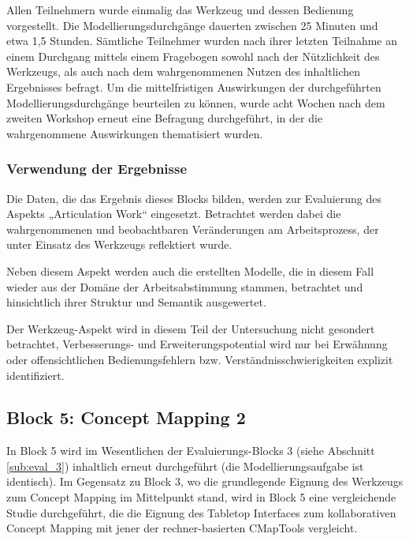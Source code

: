 Allen Teilnehmern wurde einmalig das Werkzeug und dessen Bedienung vorgestellt. Die Modellierungsdurchgänge dauerten zwischen 25 Minuten und etwa 1,5 Stunden. Sämtliche Teilnehmer wurden nach ihrer letzten Teilnahme an einem Durchgang mittels einem Fragebogen sowohl nach der Nützlichkeit des Werkzeugs, als auch nach dem wahrgenommenen Nutzen des inhaltlichen Ergebnisses befragt. Um die mittelfristigen Auswirkungen der durchgeführten Modellierungsdurchgänge beurteilen zu können, wurde acht Wochen nach dem zweiten Workshop erneut eine Befragung durchgeführt, in der die wahrgenommene Auswirkungen thematisiert wurden. 


\subsubsection{Verwendung der Ergebnisse} %
\label{ssub:4_verwendung_der_ergebnisse}

Die Daten, die das Ergebnis dieses Blocks bilden, werden zur Evaluierung des Aspekts „Articulation Work“ eingesetzt. Betrachtet werden dabei die wahrgenommenen und beobachtbaren Veränderungen am Arbeitsprozess, der unter Einsatz des Werkzeugs reflektiert wurde.

Neben diesem Aspekt werden auch die erstellten Modelle, die in diesem Fall wieder aus der Domäne der Arbeitsabstimmung stammen, betrachtet und hinsichtlich ihrer Struktur und Semantik ausgewertet. 

Der Werkzeug-Aspekt wird in diesem Teil der Untersuchung nicht gesondert betrachtet, Verbesserungs- und Erweiterungspotential wird nur bei Erwähnung oder offensichtlichen Bedienungsfehlern bzw. Verständnisschwierigkeiten explizit identifiziert.


\subsection{Block 5: Concept Mapping 2}
\label{sub:eval_5}

In Block 5 wird im Wesentlichen der Evaluierungs-Blocks 3 (siehe Abschnitt \ref{sub:eval_3}) inhaltlich erneut durchgeführt (die Modellierungsaufgabe ist identisch). Im Gegensatz zu Block 3, wo die grundlegende Eignung des Werkzeugs zum Concept Mapping im Mittelpunkt stand, wird in Block 5 eine vergleichende Studie durchgeführt, die die Eignung des Tabletop Interfaces zum kollaborativen Concept Mapping mit jener der rechner-basierten CMapTools \citep{Canas04} vergleicht.

